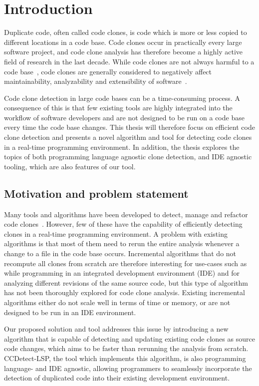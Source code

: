\chapter{Introduction}

Duplicate code, often called code clones, is code which is more or less copied to
different locations in a code base. Code clones occur in practically every large software
project, and code clone analysis has therefore become a highly active field of research in
the last decade. While code clones are not always harmful to a code
base~\cite[209]{Inoue_introduction_to_cc}, code clones are generally considered to
negatively affect maintainability, analyzability and extensibility of
software~\cite[22]{Inoue_introduction_to_cc}.

Code clone detection in large code bases can be a time-consuming process. A consequence of
this is that few existing tools are highly integrated into the workflow of software
developers and are not designed to be run on a code base every time the code base changes.
This thesis will therefore focus on efficient code clone detection and presents a novel
algorithm and tool for detecting code clones in a real-time programming environment. In
addition, the thesis explores the topics of both programming language agnostic clone
detection, and IDE agnostic tooling, which are also features of our tool.

\section{Motivation and problem statement}

Many tools and algorithms have been developed to detect, manage and refactor code
clones~\cite[6]{Inoue_introduction_to_cc}. However, few of these have the capability of
efficiently detecting clones in a real-time programming environment. A problem with
existing algorithms is that most of them need to rerun the entire analysis whenever a
change to a file in the code base occurs. Incremental algorithms that do not recompute all
clones from scratch are therefore interesting for use-cases such as while programming in
an integrated development environment (IDE) and for analyzing different revisions of the
same source code, but this type of algorithm has not been thoroughly explored for code
clone analysis. Existing incremental algorithms either do not scale well in terms of time
or memory, or are not designed to be run in an IDE environment.

Our proposed solution and tool addresses this issue by introducing a new algorithm that is
capable of detecting and updating existing code clones as source code changes, which aims
to be faster than rerunning the analysis from scratch. CCDetect-LSP, the tool which
implements this algorithm, is also programming language- and IDE agnostic, allowing
programmers to seamlessly incorporate the detection of duplicated code into their existing
development environment.

